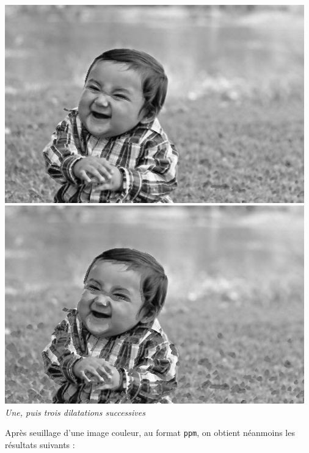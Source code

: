 \documentclass[a4paper,11pt]{article}
\begin{document}
\begin{center}
\\
\includegraphics[scale=0.35]{babydilateg1.png}
\includegraphics[scale=0.35]{babydilateg3.png}\\
\textit{Une, puis trois dilatations successives}
\end{center}
Après seuillage d'une image couleur, au format \texttt{ppm}, on obtient néanmoins les résultats suivants :
\end{document}

